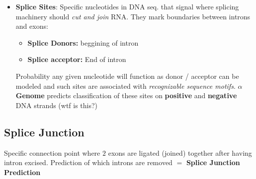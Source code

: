 \documentclass[../main.tex]{subfiles}
\begin{document}
\vspace{0.2cm}

\begin{itemize}
    \item \textbf{Splice Sites}: Specific nucleotides in DNA seq. that signal where splicing machinery should \textit{cut and join} RNA. They mark boundaries between introns and exons: 
    \begin{itemize}
        \item \textbf{Splice Donors:} beggining of intron 
        \item \textbf{Splice acceptor:} End of intron 
    \end{itemize}

    Probability any given nucleotide will function as donor / acceptor can be modeled and such sites are associated with \textit{recognizable sequence motifs}. \textbf{$\alpha$Genome} predicts classification of these sites on \textbf{positive} and \textbf{negative} DNA strands (wtf is this?)
\end{itemize}

\subsection{Splice Junction}
Specific connection point where $2$ exons are ligated (joined) together after having intron excised. Prediction of which introns are removed $=$ \textbf{Splice Junction Prediction}
\end{document}
